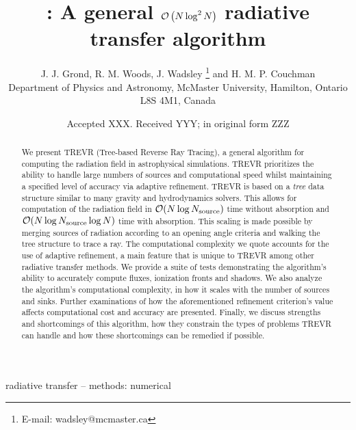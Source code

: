 \documentclass[fleq,usenatbib]{mnras}
\title[]{\acro{}: A general $\mathcal{O}\left(N\log^2N\right)$ radiative transfer algorithm}
\author[J. J. Grond et al.]{
J. J. Grond,
R. M. Woods,
J. Wadsley \thanks{E-mail:  wadsley@mcmaster.ca}
and H. M. P. Couchman
\\
Department of Physics and Astronomy, McMaster University, Hamilton, Ontario L8S
 4M1, Canada}
\date{Accepted XXX. Received YYY; in original form ZZZ}
\newcommand{\acro}{TREVR}
\newcommand{\NS}{N_{\rm source}}
\begin{document}
\label{firstpage}
\pagerange{\pageref{firstpage}--\pageref{lastpage}}
\maketitle

\begin{abstract}
We present \acro{} (Tree-based Reverse Ray Tracing), a general algorithm for 
computing the radiation field in astrophysical simulations. \acro{} 
prioritizes the ability to handle large numbers of sources and computational 
speed whilst maintaining a specified level of accuracy via adaptive 
refinement. \acro{} is based on a \emph{tree} data structure similar to many 
gravity and hydrodynamics solvers. This allows for computation of the 
radiation field in $\mathcal{O}(N \log \NS)$ time without absorption and 
$\mathcal{O}(N \log \NS \log{N})$ time with absorption. This scaling is made 
possible by merging sources of radiation according to an opening angle 
criteria and walking the tree structure to trace a ray. The computational 
complexity we quote accounts for the use of adaptive refinement, a main 
feature that is unique to \acro{} among other radiative transfer methods. We 
provide a suite of tests demonstrating the algorithm's ability to accurately 
compute fluxes, ionization fronts and shadows. We also analyze the algorithm's 
computational complexity, in how it scales with the number of sources and 
sinks. Further examinations of how the aforementioned refinement criterion's 
value affects computational cost and accuracy are presented. Finally, we 
discuss strengths and shortcomings of this algorithm, how they constrain the 
types of problems \acro{} can handle and how these shortcomings can be 
remedied if possible.

\end{abstract}

\begin{keywords}
radiative transfer -- methods: numerical
\end{keywords}


\end{document}
